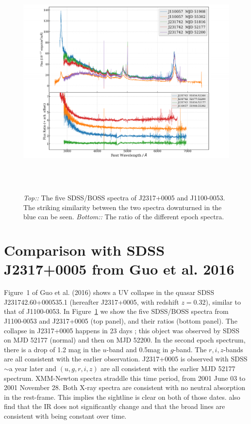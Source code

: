 \documentclass[11pt,a4paper]{article}
\begin{document}
\begin{figure}[h]
  \centering
  \includegraphics[width=16.00cm, height=12.0cm, trim=0.3cm 0.0cm 2.0cm 0.0cm, clip]
  {../plots/spectra/J110057_vs_Guo_both_20171115.pdf}
  \caption[]{ {\it Top::} The five SDSS/BOSS spectra of J2317+0005 and
    J1100-0053.  The striking similarity between the two spectra downturned in
    the blue can be seen.  {\it Bottom::} The ratio of the different epoch
    spectra.}
  \label{fig:J1100-0053_vs_Guo}
\end{figure}
\section*{Comparison with SDSS J2317+0005 from Guo et al. 2016}
Figure~1 of Guo et al. (2016) shows a UV collapse in the quasar SDSS
J231742.60+000535.1 (hereafter J2317+0005, with redshift $z=0.32$),
similar to that of J1100-0053. In Figure~\ref{fig:J1100-0053_vs_Guo} we show
the five SDSS/BOSS spectra from J1100-0053 and J2317+0005 (top panel),
and their ratios (bottom panel).  The collapse in J2317+0005 happens
in 23 days \citep[Figure 2 of ][]{Guo2016}; this object was observed
by SDSS on MJD 52177 (normal) and then on MJD 52200. In the second
epoch spectrum, there is a drop of 1.2 mag in the $u$-band and 0.5mag
in $g$-band. The $r,i,z$-bands are all consistent with the earlier
observation. J2317+0005 is observed with SDSS $\sim$a year later and
$(u,g,r,i,z)$ are all consistent with the earlier MJD 52177
spectrum. XMM-Newton spectra straddle this time period, from 2001 June
03 to 2001 November 28. Both X-ray spectra are consistent with no neutral
absorption in the rest-frame. This implies the sightline is clear on
both of those dates.  \citet{Guo2016} also find that the IR does not
significantly change and that the broad lines are consistent with
being constant over time.
\end{document}
